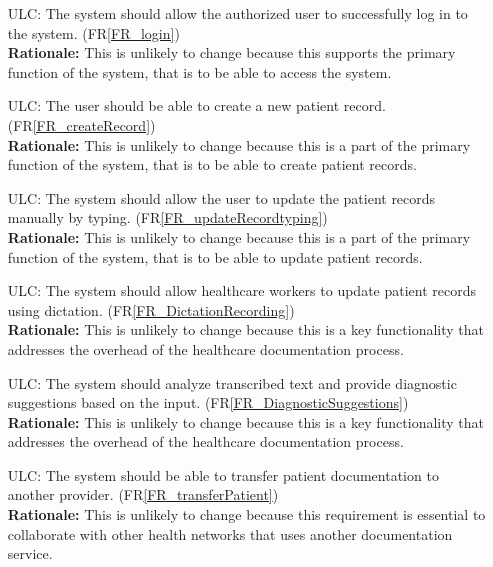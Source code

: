 \documentclass[12pt]{article}
\newcounter{lcnum} %
\newcounter{ulcnum} %
\begin{document}
\begin{itemize}
\item[ULC\refstepcounter{ulcnum}\theulcnum\label{ULC_login}:] The system should allow the authorized user to successfully log in to the system. (FR\ref{FR_login})\\
\textbf{Rationale:} This is unlikely to change because this supports the primary function of the system, that is to be able to access the system.

\item[ULC\refstepcounter{ulcnum}\theulcnum\label{ULC_createPatientRecord}:] The user should be able to create a new patient record. (FR\ref{FR_createRecord})\\
\textbf{Rationale:} This is unlikely to change because this is a part of the primary function of the system, that is to be able to create patient records.

\item[ULC\refstepcounter{ulcnum}\theulcnum\label{ULC_updatePatientRecord}:] The system should allow the user to update the patient records manually by typing. (FR\ref{FR_updateRecordtyping})\\
\textbf{Rationale:} This is unlikely to change because this is a part of the primary function of the system, that is to be able to update patient records.

\item[ULC\refstepcounter{ulcnum}\theulcnum\label{ULC_dictation}:] The system should allow healthcare workers to update patient records using dictation. (FR\ref{FR_DictationRecording})\\
\textbf{Rationale:} This is unlikely to change because this is a key functionality that addresses the overhead of the healthcare documentation process. 

\item[ULC\refstepcounter{ulcnum}\theulcnum\label{ULC_diagnosticSuggestions}:] The system should analyze transcribed text and provide diagnostic suggestions based on the input. (FR\ref{FR_DiagnosticSuggestions})\\
\textbf{Rationale:} This is unlikely to change because this is a key functionality that addresses the overhead of the healthcare documentation process. 

\item[ULC\refstepcounter{ulcnum}\theulcnum\label{ULC_transferPatient}:] The system should be able to transfer patient documentation to another provider. (FR\ref{FR_transferPatient})\\
\textbf{Rationale:} This is unlikely to change because this requirement is essential to collaborate with other health networks that uses another documentation service.
\end{itemize}
\end{document}

